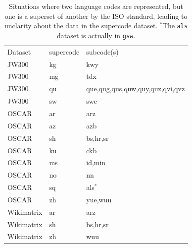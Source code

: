 \begin{table}[t]
    \centering
    \begin{tabular}{lll}
        \toprule
        Dataset    & supercode & subcode(s)                      \\
        \hdashline
        JW300      & kg        & kwy                             \\
        JW300      & mg        & tdx                             \\
        JW300      & qu        & que,qug,qus,quw,quy,quz,qvi,qvz \\
        JW300      & sw        & swc                             \\
        \hdashline
        OSCAR      & ar        & arz                             \\
        OSCAR      & az        & azb                             \\
        OSCAR      & sh        & bs,hr,sr                        \\
        OSCAR      & ku        & ckb                             \\
        OSCAR      & ms        & id,min                          \\
        OSCAR      & no        & nn                              \\
        OSCAR      & sq        & als$^{*}$                       \\
        OSCAR      & zh        & yue,wuu                         \\
        \hdashline
        Wikimatrix & ar        & arz                             \\
        Wikimatrix & sh        & bs,hr,sr                        \\
        Wikimatrix & zh        & wuu                             \\
        \bottomrule
    \end{tabular}
    \caption{Situations where two language codes are represented, but one is a superset of another by the ISO standard, leading to unclarity about the data in the supercode dataset. $^{*}$The \texttt{als} dataset is actually in \texttt{gsw}.}
    \label{tab:supersets}
\end{table}



